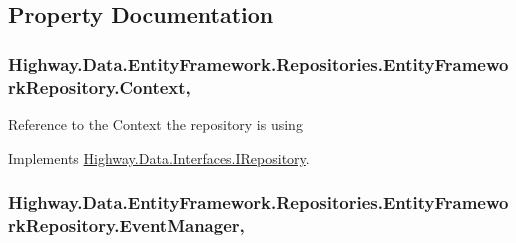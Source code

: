 \subsection{Property Documentation}
\hypertarget{class_highway_1_1_data_1_1_entity_framework_1_1_repositories_1_1_entity_framework_repository_a39447e7deb1284fc5e5d9ea7c2c78c63}{
\subsubsection[{Context}]{ Highway.\-Data.\-Entity\-Framework.\-Repositories.\-Entity\-Framework\-Repository.\-Context\hspace{0.3cm}{\ttfamily [get]}, {\ttfamily [set]}}}\label{class_highway_1_1_data_1_1_entity_framework_1_1_repositories_1_1_entity_framework_repository_a39447e7deb1284fc5e5d9ea7c2c78c63}


Reference to the Context the repository is using 



Implements \hyperlink{interface_highway_1_1_data_1_1_interfaces_1_1_i_repository_aadf2e3d1d5b118f2fe6e2b1fc1ae8e77}{Highway.\-Data.\-Interfaces.\-I\-Repository}.

\hypertarget{class_highway_1_1_data_1_1_entity_framework_1_1_repositories_1_1_entity_framework_repository_abb629b7ba44c32a78951f64554f52e06}{
\subsubsection[{Event\-Manager}]{ Highway.\-Data.\-Entity\-Framework.\-Repositories.\-Entity\-Framework\-Repository.\-Event\-Manager\hspace{0.3cm}{\ttfamily [get]}, {\ttfamily [set]}}}\label{class_highway_1_1_data_1_1_entity_framework_1_1_repositories_1_1_entity_framework_repository_abb629b7ba44c32a78951f64554f52e06}


